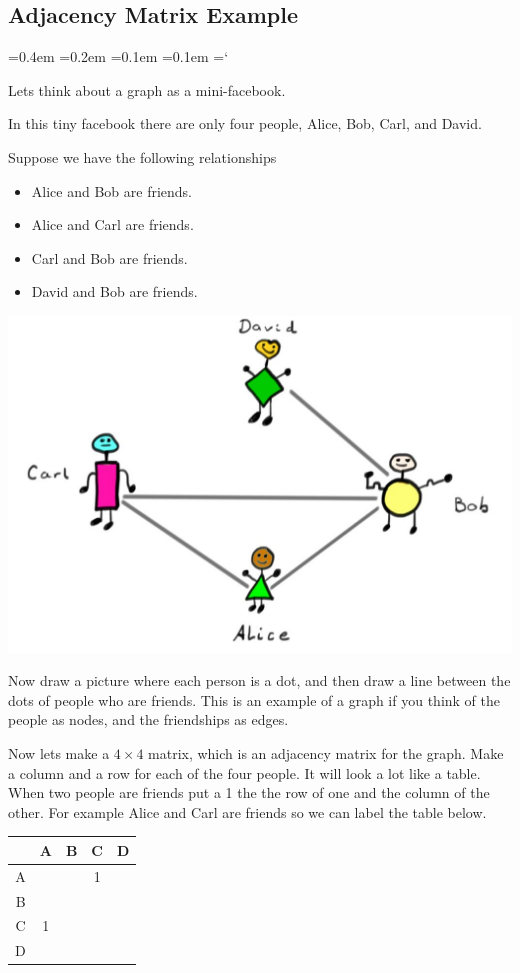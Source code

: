 
\subsection*{Adjacency Matrix Example}

{\ttfamily
{}\font=0.4em
\font=0.2em
\font=0.1em
\font=0.1em
\hyphenchar\font=`\-


\hypertarget{scripts_matrices_example}{Lets think about a graph as a mini-facebook.} In this tiny facebook there are only four people, Alice, Bob, Carl, and David. 

Suppose we have the following relationships
\begin{itemize}
\item Alice and Bob are friends.
\item Alice and Carl are friends.
\item Carl and Bob are friends.
\item David and Bob are friends.
\end{itemize}

\begin{center}
\includegraphics[scale=.25]{facebook.jpg}
\end{center}

Now draw a picture where each person is a dot, and then draw a line between the dots of people who are friends. This is an example of a graph if you think of the people as nodes, and the friendships as edges.

Now lets make a $4 \times 4$ matrix, which is an adjacency matrix for the graph. Make a column and a row for each of the four people. It will look a lot like a table. When two people are friends put a 1 the the row of one and the column of the other. For example Alice and Carl are friends so we can label the table below.
\begin{center}
\begin{tabular}{r | c c c c}
 & A & B& C & D \\
 \hline
 A & & & 1 &  \\
 B & & & &  \\
 C & 1 & & &  \\
 D & & & &  \\
\end{tabular}
\end{center}

}
